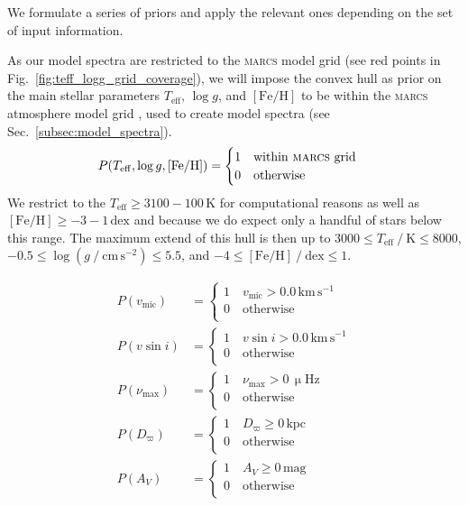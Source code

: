 \documentclass[
  journal=pasa,
  manuscript=research-paper, %
  year=2021,
  volume=37,
]{cup-journal}
\newcommand{\Teff}{$T_\mathrm{eff}$\xspace}
\newcommand{\logg}{$\log g$\xspace}
\newcommand{\feh}{$\mathrm{[Fe/H]}$\xspace}
\newcommand{\marcs}{\textsc{marcs}\xspace}
\newcommand{\dex}{\,\mathrm{dex}}	%
\newcommand{\K}{\,\mathrm{K}}	%
\newcommand{\kpc}{\,\mathrm{kpc}}	%
\newcommand{\mags}{\,\mathrm{mag}}	%
\newcommand{\kms}{\,\mathrm{km\,s^{-1}}}	%
\newcommand{\muHz}{\,\mathrm{\upmu Hz}} %
\begin{document}
We formulate a series of priors and apply the relevant ones depending on the set of input information.

As our model spectra are restricted to the \marcs model grid (see red points in Fig.~\ref{fig:teff_logg_grid_coverage}), we will impose the convex hull as prior on the main stellar parameters \Teff, \logg, and \feh to be within the \marcs atmosphere model grid \citep{Gustafsson2008}, used to create model spectra (see Sec.~\ref{subsec:model_spectra}).
\begin{align}
    P(T_\mathrm{eff}, \log g, \mathrm{[Fe/H]}) = \begin{cases}
    1 \quad \text{within \marcs grid} \\
    0 \quad \text{otherwise} \\
    \end{cases}
\end{align}
We restrict to the $T_\text{eff} \geq 3100 - 100\K$ for computational reasons as well as $\mathrm{[Fe/H]} \geq -3 - 1\dex$ and because we do expect only a handful of stars below this range. The maximum extend of this hull is then up to $3000 \leq T_\text{eff}~/~\mathrm{K} \leq 8000$, $-0.5 \leq \log (g~/~\mathrm{cm\,s^{-2}}) \leq 5.5$, and $-4 \leq \mathrm{[Fe/H]}~/~\mathrm{dex} \leq 1$.

\begin{align}
    P(v_\text{mic}) &= \begin{cases}
    1 \quad v_\text{mic} > 0.0\kms \\
    0 \quad \text{otherwise} \\
    \end{cases} \\
    P(v \sin i) &= \begin{cases}
    1 \quad v \sin i > 0.0\kms \\
    0 \quad \text{otherwise} \\
    \end{cases} \\
    P(\nu_\text{max}) &= \begin{cases}
    1 \quad \nu_\text{max} > 0\muHz \\
    0 \quad \text{otherwise} \\
    \end{cases} \\
    P(D_\varpi) &= \begin{cases}
    1 \quad D_\varpi \geq 0\kpc \\
    0 \quad \text{otherwise} \\
    \end{cases} \\
    P(A_V) &= \begin{cases}
    1 \quad A_V \geq 0\mags \\
    0 \quad \text{otherwise} \\
    \end{cases}
\end{align}
\end{document}
